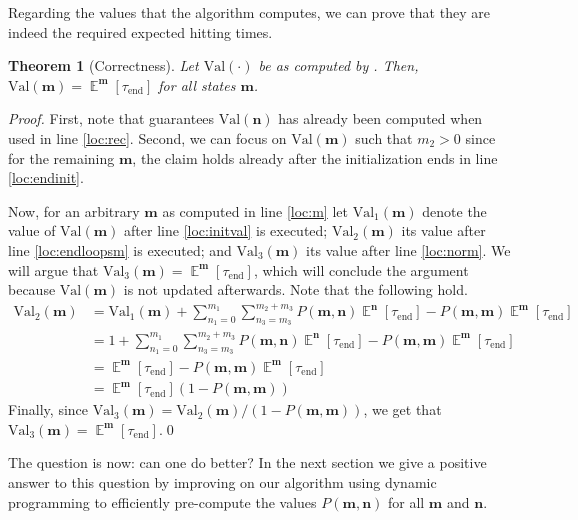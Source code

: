 \documentclass[a4paper,preprint]{elsarticle}
\newtheorem{theorem}{Theorem}
\newcommand{\htime}{\tau_\mathrm{end}}
\newcommand{\Val}{\mathrm{Val}}
\renewcommand{\vec}[1]{\boldsymbol{#1}}
\DeclareMathOperator{\Ex}{\mathbb{E}}
\begin{document}
Regarding the values that the algorithm computes, we can prove that they are
indeed the required expected hitting times.
\begin{theorem}[Correctness]
  Let $\Val(\cdot)$ be as computed by .  Then, $\Val(\vec{m})
  = \Ex^{\vec{m}}[\htime]$ for all states $\vec{m}$.
\end{theorem}
\begin{proof}
  First, note that  guarantees $\Val(\vec{n})$ has already
  been computed when used in line \ref{loc:rec}. Second, we can focus on
  $\Val(\vec{m})$ such that $m_2 > 0$ since for the remaining $\vec{m}$, the
  claim holds already after the initialization ends in line \ref{loc:endinit}.

  Now, for an arbitrary $\vec{m}$ as computed in line \ref{loc:m} let
  $\Val_1(\vec{m})$ denote the value of $\Val(\vec{m})$ after line
  \ref{loc:initval} is executed; $\Val_2(\vec{m})$ its value after line
  \ref{loc:endloopsm} is executed; and $\Val_3(\vec{m})$ its value after line
  \ref{loc:norm}. We will argue that $\Val_3(\vec{m}) =
  \Ex^{\vec{m}}[\htime]$, which will conclude the argument because
  $\Val(\vec{m})$ is not updated afterwards. Note that the following hold.
  \begin{align*}
    \Val_2(\vec{m}) &{} = \Val_1(\vec{m}) + \sum_{n_1 = 0}^{m_1} \sum_{n_3 = m_3}^{m_2+m_3}
            P(\vec{m},\vec{n}) \Ex^{\vec{n}}[\htime] -
            P(\vec{m},\vec{m})\Ex^{\vec{m}}[\htime]\\
                    &{} = 1 + \sum_{n_1 = 0}^{m_1} \sum_{n_3 = m_3}^{m_2+m_3}
            P(\vec{m},\vec{n}) \Ex^{\vec{n}}[\htime] -
            P(\vec{m},\vec{m})\Ex^{\vec{m}}[\htime]\\
                    &{} = \Ex^{\vec{m}}[\htime] -
            P(\vec{m},\vec{m})\Ex^{\vec{m}}[\htime]\\
                    &{} = \Ex^{\vec{m}}[\htime](1 - P(\vec{m},\vec{m}))
  \end{align*}
  Finally, since $\Val_3(\vec{m}) = \Val_2(\vec{m})/(1-P(\vec{m},\vec{m}))$,
  we get that $\Val_3(\vec{m}) = \Ex^{\vec{m}}[\htime]$.\qed
\end{proof}

The question is now: can one do better? In the next section we give a positive
answer to this question by improving on our algorithm using dynamic
programming to efficiently pre-compute the values $P(\vec{m},\vec{n})$ for all $\vec{m}$ and $\vec{n}$.
\end{document}
